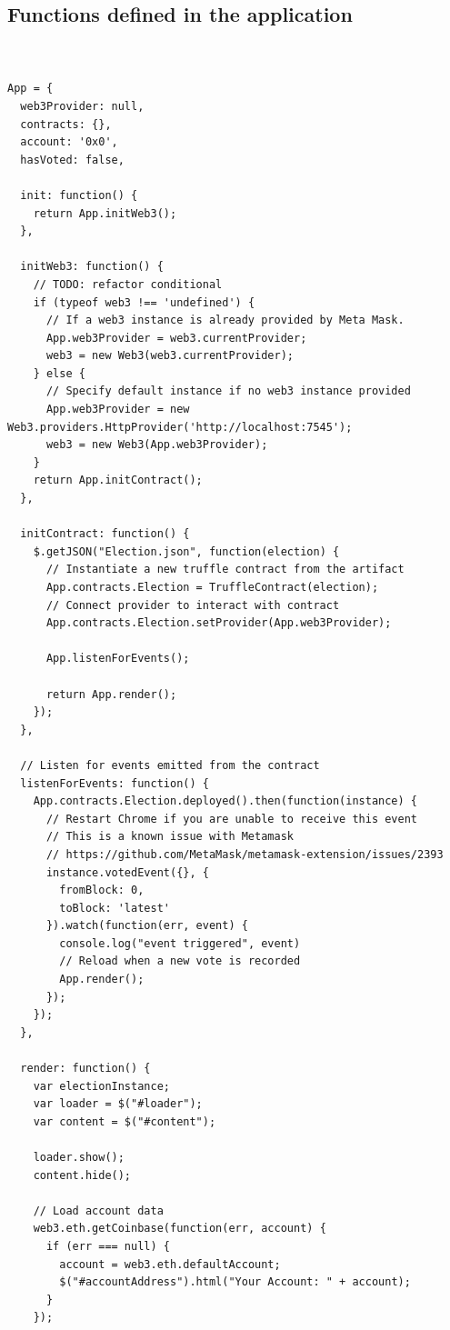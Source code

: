 \documentclass{article}
\begin{document}
\begin{enumerate}
\chapter{Functions defined in the application}
\begin{verbatim}
    

App = {
  web3Provider: null,
  contracts: {},
  account: '0x0',
  hasVoted: false,

  init: function() {
    return App.initWeb3();
  },

  initWeb3: function() {
    // TODO: refactor conditional
    if (typeof web3 !== 'undefined') {
      // If a web3 instance is already provided by Meta Mask.
      App.web3Provider = web3.currentProvider;
      web3 = new Web3(web3.currentProvider);
    } else {
      // Specify default instance if no web3 instance provided
      App.web3Provider = new Web3.providers.HttpProvider('http://localhost:7545');
      web3 = new Web3(App.web3Provider);
    }
    return App.initContract();
  },

  initContract: function() {
    $.getJSON("Election.json", function(election) {
      // Instantiate a new truffle contract from the artifact
      App.contracts.Election = TruffleContract(election);
      // Connect provider to interact with contract
      App.contracts.Election.setProvider(App.web3Provider);

      App.listenForEvents();

      return App.render();
    });
  },

  // Listen for events emitted from the contract
  listenForEvents: function() {
    App.contracts.Election.deployed().then(function(instance) {
      // Restart Chrome if you are unable to receive this event
      // This is a known issue with Metamask
      // https://github.com/MetaMask/metamask-extension/issues/2393
      instance.votedEvent({}, {
        fromBlock: 0,
        toBlock: 'latest'
      }).watch(function(err, event) {
        console.log("event triggered", event)
        // Reload when a new vote is recorded
        App.render();
      });
    });
  },

  render: function() {
    var electionInstance;
    var loader = $("#loader");
    var content = $("#content");

    loader.show();
    content.hide();

    // Load account data
    web3.eth.getCoinbase(function(err, account) {
      if (err === null) {
        account = web3.eth.defaultAccount;
        $("#accountAddress").html("Your Account: " + account);
      }
    });


\end{verbatim}
\end{enumerate}
\end{document}
